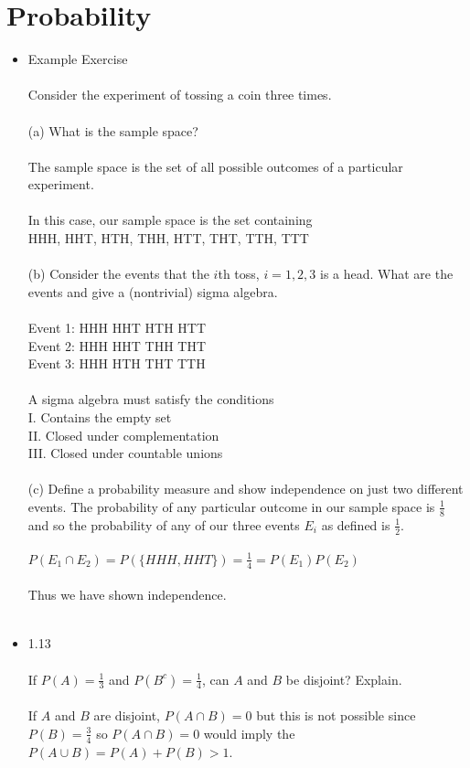 \documentclass{article}
\begin{document}
\section{Probability}
\begin{itemize}
    \item Example Exercise \\\\
    Consider the experiment of tossing a coin three times.\\\\
    (a) What is the sample space?\\\\
    The sample space is the set of all possible outcomes of a particular experiment. \\\\
    In this case, our sample space is the set containing\\
    HHH, HHT, HTH, THH, HTT, THT, TTH, TTT\\\\
    (b) Consider the events that the $i$th toss, $i=1,2,3$ is a head.  What are the events and give a (nontrivial) sigma algebra.\\\\
    Event 1: HHH HHT HTH HTT\\
    Event 2: HHH HHT THH THT\\
    Event 3: HHH HTH THT TTH\\\\
    A sigma algebra must satisfy the conditions\\
    I. Contains the empty set\\
    II. Closed under complementation\\
    III. Closed under countable unions\\\\
    (c) Define a probability measure and show independence on just two different events.  
    The probability of any particular outcome in our sample space is $\frac{1}{8}$ and so the probability of any of our three events $E_i$ as defined is $\frac{1}{2}$.\\\\
    $P(E_1\cap E_2)=P(\{HHH,HHT\})=\frac{1}{4}=P(E_1)P(E_2)$\\\\
    Thus we have shown independence.\\\\
    \item 1.13\\\\
    If $P(A)=\frac{1}{3}$ and $P(B^c)=\frac{1}{4}$, can $A$ and $B$ be disjoint?  Explain.\\\\
    If $A$ and $B$ are disjoint, $P(A\cap B)=0$ but this is not possible since $P(B)=\frac{3}{4}$ so $P(A\cap B)=0$ would imply the $P(A\cup B)=P(A)+P(B)>1$.\\\\
\end{itemize}
\end{document}

